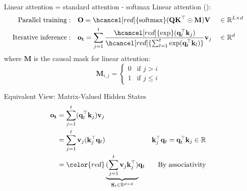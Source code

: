 \begin{frame}{Linear attention = standard attention - softmax}
    Linear attention (\cite{katharopoulos2020transformers}):
    \[
    \begin{aligned}
        \mathrm{Parallel\ training:} &&& \mathbf{O} = \hcancel[red]{\mathrm{softmax}}(\mathbf{Q}\mathbf{K}^\top \odot \mathbf{M})\mathbf{V} &&\in \mathbb{R}^{L\times d}   \\
        \mathrm{Iterative\ inference:} &&&\mathbf{o_t} = \sum_{j=1}^t \frac{\hcancel[red]{\exp}(\mathbf{q}_t^\top \mathbf{k}_j)}{\hcancel[red]{\sum_{l=1}^t\exp(\mathbf{q}^\top_t \mathbf{k}_l)}}\mathbf{v}_j &&\in \mathbb{R}^d 
    \end{aligned}
    \]
    where $\mathbf{M}$ is the causal mask for linear attention:
    \[
    \mathbf{M}_{i,j} = \begin{cases}
        0 & \text{if } j > i \\
        1 & \text{if } j \leq i
    \end{cases}
    \] 
\end{frame}

\begin{frame}{Equivalent View: Matrix-Valued Hidden States}
    $$ \begin{aligned}  
        \mathbf{o_t} &=  \sum_{j=1}^t (\mathbf{q}_t^\top \mathbf{k}_j) \mathbf{v}_j \\
         &= \sum_{j=1}^t \mathbf{v}_j(\mathbf{k}_j^\top \mathbf{q}_t) &  \mathbf{k}_j^\top \mathbf{q}_t = \mathbf{q}_t^\top \mathbf{k}_j \in \mathbb{R}\\  
        &= {\color{red}\underbrace{(\sum_{j=1}^t \mathbf{v}_j\mathbf{k}_j^\top)}_{\mathbf{S}_t \in \mathbb{R}^{d \times d}}}\mathbf{q}_t & \text{By associativity}
    \end{aligned} $$    
\end{frame}

